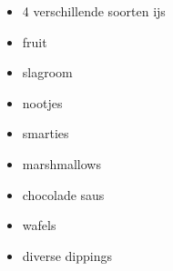 \begin{itemize}
	\item	4 verschillende soorten  ijs
	\item	fruit
	\item	slagroom
	\item	nootjes
	\item	smarties
	\item	marshmallows
	\item	chocolade saus
	\item	wafels
	\item	diverse dippings
\end{itemize}

